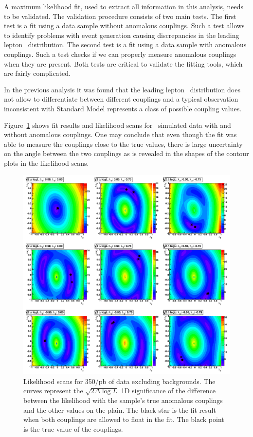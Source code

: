 A maximum likelihood fit, used to extract all information in this
analysis, needs to be validated. The validation procedure consists of
two main tests. The first test is a fit using a data sample without
anomalous couplings. Such a test allows to identify problems with
event generation causing discrepancies in the leading lepton
\pt\ distribution. The second test is a fit using a data sample with
anomalous couplings. Such a test checks if we can properly measure
anomalous couplings when they are present. Both tests are critical to
validate the fitting tools, which are fairly complicated.

In the previous analysis it was found that the leading lepton
\pt\ distribution does not allow to differentiate between different
couplings and a typical observation inconsistent with Standard Model
represents a class of possible coupling values.

Figure~\ref{fig:val_scans} shows fit results and likelihood scans for
\ww\ simulated data with and without anomalous couplings. One may
conclude that even though the fit was able to measure the couplings
close to the true values, there is large uncertainty on the angle
between the two couplings as is revealed in the shapes of the contour
plots in the likelihood scans.

\begin{figure}[tp]
  \centerline{
    \includegraphics[width=1.0\textwidth]{figures/validation_likelihood_scans}
  }

  \caption[Likelihood scan for Signal Monte Carlo] {Likelihood scans
    for 350/pb of data excluding backgrounds. The curves
    represent the $\sqrt{2\Delta\log L}$ 1D significance of the difference between the
    likelihood with the sample's true anomalous couplings and the other
    values on the plain. The black star is the fit result when both couplings are
    allowed to float in the fit. The black point is the true value of the couplings.}
  \label{fig:val_scans}
\end{figure}

